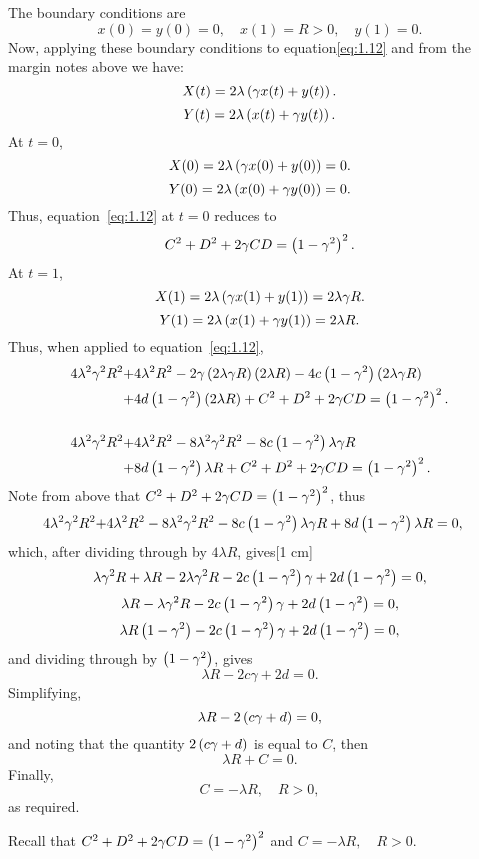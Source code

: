The boundary conditions are
\[
	x(0)=y(0)=0,\quad x(1)=R>0,\quad y(1)=0.
\]
Now, applying these boundary conditions to equation\eqref{eq:1.12} and from the margin notes above we have:
\[
	X(t) = 2\lambda\left(\gamma x(t) + y(t)\right).
\]
\[
	Y(t) = 2\lambda\left(x(t) + \gamma y(t)\right).
\]
At $t=0$,
\[
	X(0) = 2\lambda\left(\gamma x(0) + y(0)\right) = 0.
\]
\[
	Y(0) = 2\lambda\left(x(0) + \gamma y(0)\right) = 0.
\]
Thus, equation~\eqref{eq:1.12} at $t=0$ reduces to 
\[
	C^2 + D^2 + 2\gamma C D = \left(1-\gamma^2\right)^2.
\]
At $t=1$,
\[
	X(1) = 2\lambda\left(\gamma x(1) + y(1)\right) = 2\lambda\gamma R.
\]
\[
	Y(1) = 2\lambda\left(x(1) + \gamma y(1)\right) = 2\lambda R.
\]
Thus, when applied to equation~\eqref{eq:1.12},
\begin{align*}
	4\lambda^2\gamma^2R^2 +& 4\lambda^2 R^2 -2\gamma\left(2\lambda\gamma R\right)\left(2\lambda R\right)-4c\left(1-\gamma^2\right)\left(2\lambda\gamma R\right)\\
	+& 4d\left(1-\gamma^2\right)\left(2\lambda R\right)+C^2+D^2 + 2\gamma CD = \left(1-\gamma^2\right)^2.\\\\
	4\lambda^2\gamma^2R^2 +& 4\lambda^2 R^2 - 8\lambda^2\gamma^2R^2 - 8c\left(1-\gamma^2\right)\lambda\gamma R\\
	+& 8d\left(1-\gamma^2\right)\lambda R + C^2+D^2 + 2\gamma CD = \left(1-\gamma^2\right)^2.
\end{align*}
Note from above that $C^2+D^2+2\gamma CD = \left(1-\gamma^2\right)^2$, thus
\begin{align*}
	4\lambda^2\gamma^2R^2 +& 4\lambda^2 R^2 - 8\lambda^2\gamma^2R^2 - 8c\left(1-\gamma^2\right)\lambda\gamma R
	+ 8d\left(1-\gamma^2\right)\lambda R = 0,
\end{align*}
which, after dividing through by $4\lambda R$, gives[1 cm]
\[
	\lambda\gamma^2R + \lambda R - 2\lambda\gamma^2R - 2c\left(1-\gamma^2\right)\gamma
	+ 2d\left(1-\gamma^2\right) = 0,
\]
\[
	\lambda R - \lambda\gamma^2R - 2c\left(1-\gamma^2\right)\gamma
	+ 2d\left(1-\gamma^2\right) = 0,
\]
\[
	\lambda R\left(1-\gamma^2\right) - 2c\left(1-\gamma^2\right)\gamma
	+ 2d\left(1-\gamma^2\right) = 0,
\]
and dividing through by $\left(1-\gamma^2\right)$, gives
\[
	\lambda R - 2c\gamma+ 2d = 0.
\]
Simplifying,
\[
	\lambda R - 2\left(c\gamma+ d\right) = 0,
\]
and noting that the quantity $2\left(c\gamma+ d\right)$ is equal to $C$, then
\[
	\lambda R + C = 0.
\]
Finally, 
\begin{equation}
\label{eq:1.13}
	\boxed{C=-\lambda R,\quad R > 0,}
\end{equation}
as required.

Recall that $C^2+D^2+2\gamma CD = \left(1-\gamma^2\right)^2$ and $C=-\lambda R,\quad R > 0$. 

